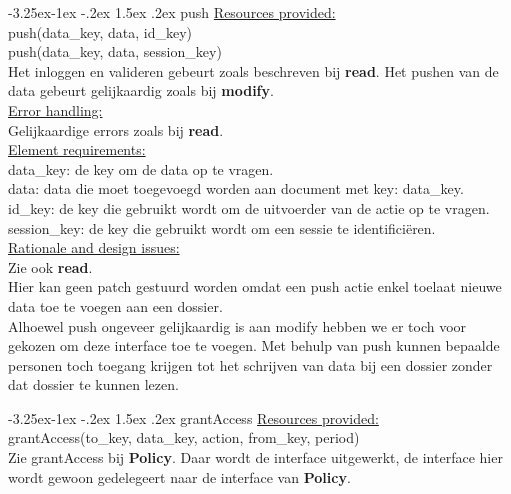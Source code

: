 \documentclass[a4paper,10pt]{article}
\makeatletter
\renewcommand\paragraph{\@startsection{paragraph}{4}{\z@}%
  {-3.25ex\@plus -1ex \@minus -.2ex}%
  {1.5ex \@plus .2ex}%
  {\normalfont\normalsize\bfseries}}
\makeatother
\begin{document}
\paragraph{push}
\underline{Resources provided:}\\
push(data\_key, data, id\_key)\\
push(data\_key, data, session\_key)\\
Het inloggen en valideren gebeurt zoals beschreven bij \textbf{read}.
Het pushen van de data gebeurt gelijkaardig zoals bij \textbf{modify}.\\

\underline{Error handling:}\\
Gelijkaardige errors zoals bij \textbf{read}.\\

\underline{Element requirements:}\\
data\_key: de key om de data op te vragen.\\
data: data die moet toegevoegd worden aan document met key: data\_key.\\
id\_key: de key die gebruikt wordt om de uitvoerder van de actie op te vragen.\\
session\_key: de key die gebruikt wordt om een sessie te identifici\"{e}ren.\\

\underline{Rationale and design issues:}\\
Zie ook \textbf{read}.\\
Hier kan geen patch gestuurd worden omdat een push actie enkel toelaat nieuwe data toe te voegen aan een dossier.\\
Alhoewel push ongeveer gelijkaardig is aan modify hebben we er toch voor gekozen om deze interface toe te voegen.  Met behulp van push kunnen bepaalde personen toch toegang krijgen tot het schrijven van data bij een dossier zonder dat dossier te kunnen lezen.

\paragraph{grantAccess}
\underline{Resources provided:}\\
grantAccess(to\_key, data\_key, action, from\_key, period)\\
Zie grantAccess bij \textbf{Policy}.  Daar wordt de interface uitgewerkt, de interface hier wordt gewoon gedelegeert naar de interface van \textbf{Policy}.
\end{document}
